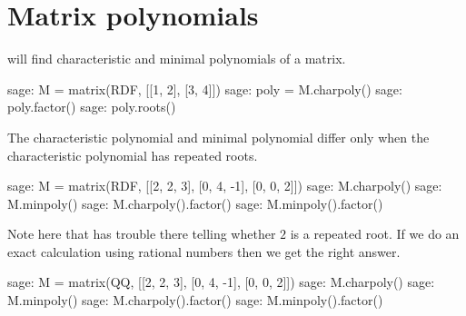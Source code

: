 





\section{Matrix polynomials}

\Sage{} will find characteristic and minimal polynomials of a matrix.
\begin{sagecommandline}
sage: M =  matrix(RDF, [[1, 2], [3, 4]]) 
sage: poly = M.charpoly()
sage: poly.factor()
sage: poly.roots()
\end{sagecommandline}

The characteristic polynomial and minimal polynomial differ only when 
the characteristic polynomial has repeated roots.
\begin{sagecommandline}
sage: M =  matrix(RDF, [[2, 2, 3], [0, 4, -1], [0, 0, 2]]) 
sage: M.charpoly()
sage: M.minpoly()
sage: M.charpoly().factor()
sage: M.minpoly().factor()
\end{sagecommandline}
\noindent
Note here that \Sage{} has trouble there telling whether $2$ is a repeated 
root.
If we do an exact calculation using 
rational numbers then we get the right answer.  
\begin{sagecommandline}
sage: M =  matrix(QQ, [[2, 2, 3], [0, 4, -1], [0, 0, 2]]) 
sage: M.charpoly()
sage: M.minpoly()
sage: M.charpoly().factor()
sage: M.minpoly().factor()
\end{sagecommandline}




